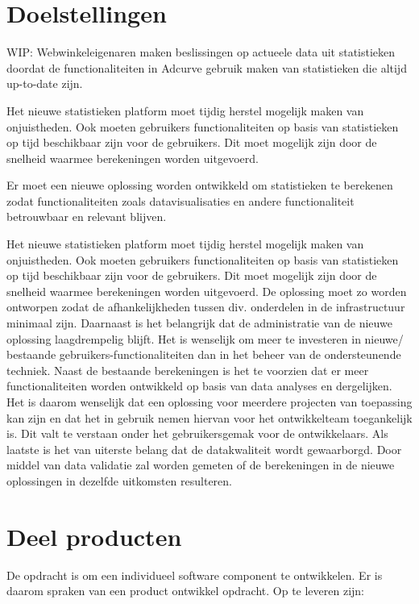 \section{Doelstellingen} %

WIP: Webwinkeleigenaren maken beslissingen op actueele data uit statistieken doordat de functionaliteiten in Adcurve gebruik maken van statistieken die altijd up-to-date zijn.

Het nieuwe statistieken platform moet tijdig herstel mogelijk maken van onjuistheden. Ook moeten gebruikers functionaliteiten op basis van statistieken op tijd beschikbaar zijn voor de gebruikers. Dit moet mogelijk zijn door de snelheid waarmee berekeningen worden uitgevoerd.

Er moet een nieuwe oplossing worden ontwikkeld om statistieken te berekenen zodat functionaliteiten zoals datavisualisaties en andere functionaliteit betrouwbaar en relevant blijven.

Het nieuwe statistieken platform moet tijdig herstel mogelijk maken van onjuistheden. Ook moeten gebruikers functionaliteiten op basis van statistieken op tijd beschikbaar zijn voor de gebruikers. Dit moet mogelijk zijn door de snelheid waarmee berekeningen worden uitgevoerd.
De oplossing moet zo worden ontworpen zodat de afhankelijkheden tussen div. onderdelen in de infrastructuur minimaal zijn.
Daarnaast is het belangrijk dat de administratie van de nieuwe oplossing laagdrempelig blijft. Het is wenselijk om meer te investeren in nieuwe/ bestaande gebruikers-functionaliteiten dan in het beheer van de ondersteunende techniek.
Naast de bestaande berekeningen is het te voorzien dat er meer functionaliteiten worden ontwikkeld op basis van data analyses en dergelijken. Het is daarom wenselijk dat een oplossing voor meerdere projecten van toepassing kan zijn en dat het in gebruik nemen hiervan voor het ontwikkelteam toegankelijk is. Dit valt te verstaan onder het gebruikersgemak voor de ontwikkelaars.
Als laatste is het van uiterste belang dat de datakwaliteit wordt gewaarborgd. Door middel van data validatie zal worden gemeten of de berekeningen in de nieuwe oplossingen in dezelfde uitkomsten resulteren.


\section{Deel producten}

De opdracht is om een individueel software component te ontwikkelen. Er is daarom spraken van een product ontwikkel opdracht. Op te leveren zijn:

